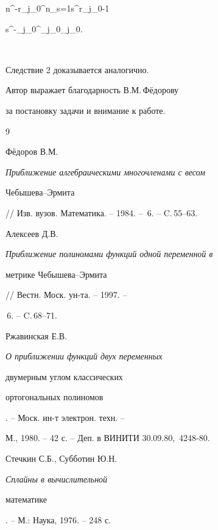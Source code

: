 n^{-r_{j_0}}\sum^n_{s=1}s^{r_{j_0}-1} 


s^{-\alpha_{j_0}}\preceq\delta^{\alpha_{j_0}}_{j_0}.\quad\square


$$ 





Следствие 2 доказывается аналогично. 


 


Автор выражает благодарность В.М.\,Ф\"едорову 


за постановку задачи и внимание к работе. 


 


\begin{thebibliography}{9} 


 




Ф\"едоров В.М. {\em Приближение алгебраическими многочленами с весом 


Чебышева--Эрмита} 


// Изв. вузов. Математика. -- 1984. -- \No\,6. -- C.\,55--63. 




Алексеев Д.В. {\em Приближение полиномами функций одной переменной в 


метрике Чебышева--Эрмита} // Вестн. Моск. ун-та. -- 1997. -- 


\No\,6. -- C.\,68--71. 




Ржавинская Е.В. {\em О приближении функций двух переменных 


двумерным углом классических 


ортогональных полиномов}. -- Моск. ин-т электрон. техн. -- 


М., 1980. -- 42 с. -- Деп. в ВИНИТИ 30.09.80, \No\,4248-80. 




Стечкин С.Б., Субботин Ю.Н. {\em Сплайны в вычислительной 


математике}. -- М.: Наука, 1976. -- 248 с. 


 


\end{thebibliography} 


 


\vskip 0.5cm 


 






 


\label{end} 


 


